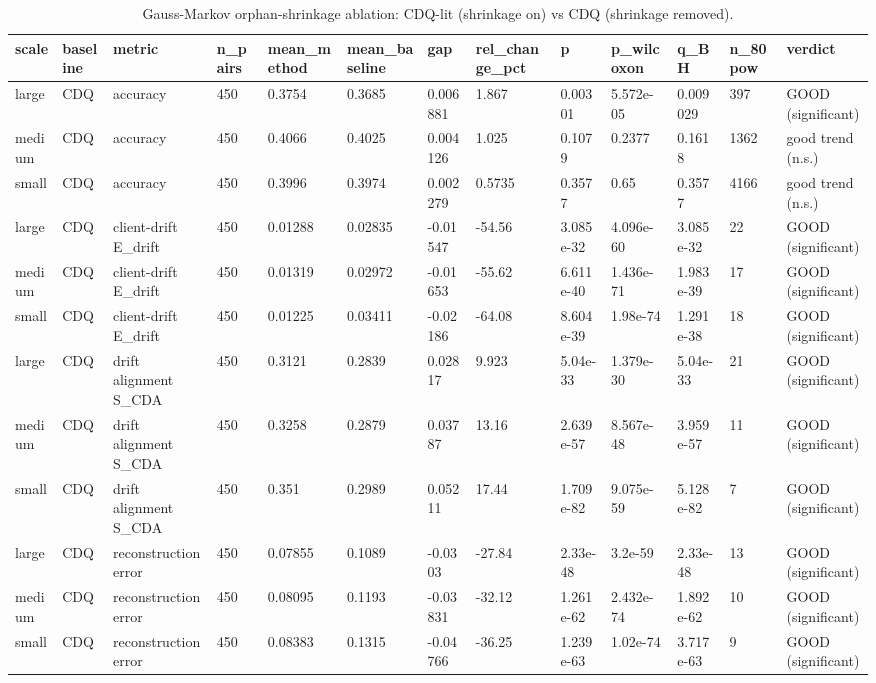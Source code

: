 \begin{table}[t]\centering\footnotesize
\caption{Gauss-Markov orphan-shrinkage ablation: CDQ-lit (shrinkage on) vs CDQ (shrinkage removed).}\label{tab:table9_shrinkage_ablation}
\begin{tabular}{lllllllllllll}
\toprule
scale & baseline & metric & n\_pairs & mean\_method & mean\_baseline & gap & rel\_change\_pct & p & p\_wilcoxon & q\_BH & n\_80pow & verdict \\
\midrule
large & CDQ & accuracy & 450 & 0.3754 & 0.3685 & 0.006881 & 1.867 & 0.00301 & 5.572e-05 & 0.009029 & 397 & GOOD (significant) \\
medium & CDQ & accuracy & 450 & 0.4066 & 0.4025 & 0.004126 & 1.025 & 0.1079 & 0.2377 & 0.1618 & 1362 & good trend (n.s.) \\
small & CDQ & accuracy & 450 & 0.3996 & 0.3974 & 0.002279 & 0.5735 & 0.3577 & 0.65 & 0.3577 & 4166 & good trend (n.s.) \\
large & CDQ & client-drift E\_drift & 450 & 0.01288 & 0.02835 & -0.01547 & -54.56 & 3.085e-32 & 4.096e-60 & 3.085e-32 & 22 & GOOD (significant) \\
medium & CDQ & client-drift E\_drift & 450 & 0.01319 & 0.02972 & -0.01653 & -55.62 & 6.611e-40 & 1.436e-71 & 1.983e-39 & 17 & GOOD (significant) \\
small & CDQ & client-drift E\_drift & 450 & 0.01225 & 0.03411 & -0.02186 & -64.08 & 8.604e-39 & 1.98e-74 & 1.291e-38 & 18 & GOOD (significant) \\
large & CDQ & drift alignment S\_CDA & 450 & 0.3121 & 0.2839 & 0.02817 & 9.923 & 5.04e-33 & 1.379e-30 & 5.04e-33 & 21 & GOOD (significant) \\
medium & CDQ & drift alignment S\_CDA & 450 & 0.3258 & 0.2879 & 0.03787 & 13.16 & 2.639e-57 & 8.567e-48 & 3.959e-57 & 11 & GOOD (significant) \\
small & CDQ & drift alignment S\_CDA & 450 & 0.351 & 0.2989 & 0.05211 & 17.44 & 1.709e-82 & 9.075e-59 & 5.128e-82 & 7 & GOOD (significant) \\
large & CDQ & reconstruction error & 450 & 0.07855 & 0.1089 & -0.0303 & -27.84 & 2.33e-48 & 3.2e-59 & 2.33e-48 & 13 & GOOD (significant) \\
medium & CDQ & reconstruction error & 450 & 0.08095 & 0.1193 & -0.03831 & -32.12 & 1.261e-62 & 2.432e-74 & 1.892e-62 & 10 & GOOD (significant) \\
small & CDQ & reconstruction error & 450 & 0.08383 & 0.1315 & -0.04766 & -36.25 & 1.239e-63 & 1.02e-74 & 3.717e-63 & 9 & GOOD (significant) \\

\end{tabular}
\end{table}
